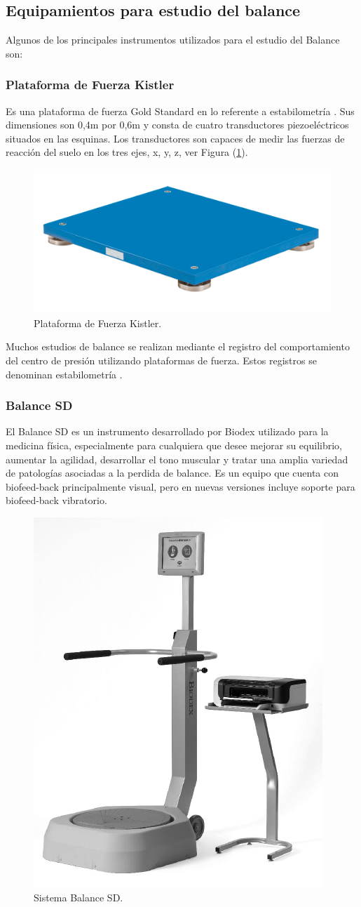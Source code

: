 \documentclass[12pt,a4paper]{article}
\begin{document}
\subsection{Equipamientos para estudio del balance} Algunos de los principales instrumentos utilizados para el estudio del Balance son:

\subsubsection{Plataforma de Fuerza Kistler} Es una plataforma de fuerza Gold Standard en lo referente a estabilometría \cite{donath_testing_2012}. Sus dimensiones son 0,4m por 0,6m y consta de cuatro transductores piezoeléctricos situados en las esquinas. Los transductores son capaces de medir las fuerzas de reacción del suelo en los tres ejes, x, y, z, ver Figura (\ref{fig:KistlerFP}).

\begin{figure}[H]
	\centering
	\includegraphics[width=0.5\linewidth]{images/KistlerFP}
	\caption{Plataforma de Fuerza Kistler.}
	\label{fig:KistlerFP}
\end{figure}

Muchos estudios de balance se realizan mediante el registro del comportamiento del centro de presión utilizando plataformas de fuerza. Estos registros se denominan estabilometría \cite{scoppa_clinical_2013}.

\subsubsection{Balance SD} El Balance SD es un instrumento desarrollado por Biodex \cite{Biodex} utilizado para la medicina física, especialmente para cualquiera que desee mejorar su equilibrio, aumentar la agilidad, desarrollar el tono muscular y tratar una amplia variedad de patologías asociadas a la perdida de balance.
Es un equipo que cuenta con biofeed-back principalmente visual, pero en nuevas versiones incluye soporte para biofeed-back vibratorio.

\begin{figure}[H]
	\centering
	\includegraphics[width=0.25\linewidth]{images/BalanceSD}
	\caption{Sistema Balance SD.}
	\label{fig:balanceSD}
\end{figure}
\end{document}

